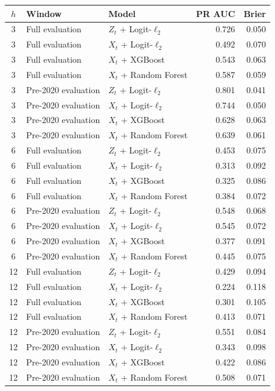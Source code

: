 \begin{tabular}{c l l r r}
\toprule
$h$ & Window & Model & PR AUC & Brier \\
\midrule
3 & Full evaluation & $Z_t$ + Logit-$\ell_2$ & 0.726 & 0.050 \\
3 & Full evaluation & $X_t$ + Logit-$\ell_2$ & 0.492 & 0.070 \\
3 & Full evaluation & $X_t$ + XGBoost & 0.543 & 0.063 \\
3 & Full evaluation & $X_t$ + Random Forest & 0.587 & 0.059 \\
\midrule
3 & Pre-2020 evaluation & $Z_t$ + Logit-$\ell_2$ & 0.801 & 0.041 \\
3 & Pre-2020 evaluation & $X_t$ + Logit-$\ell_2$ & 0.744 & 0.050 \\
3 & Pre-2020 evaluation & $X_t$ + XGBoost & 0.628 & 0.063 \\
3 & Pre-2020 evaluation & $X_t$ + Random Forest & 0.639 & 0.061 \\
\midrule
6 & Full evaluation & $Z_t$ + Logit-$\ell_2$ & 0.453 & 0.075 \\
6 & Full evaluation & $X_t$ + Logit-$\ell_2$ & 0.313 & 0.092 \\
6 & Full evaluation & $X_t$ + XGBoost & 0.325 & 0.086 \\
6 & Full evaluation & $X_t$ + Random Forest & 0.384 & 0.072 \\
\midrule
6 & Pre-2020 evaluation & $Z_t$ + Logit-$\ell_2$ & 0.548 & 0.068 \\
6 & Pre-2020 evaluation & $X_t$ + Logit-$\ell_2$ & 0.545 & 0.072 \\
6 & Pre-2020 evaluation & $X_t$ + XGBoost & 0.377 & 0.091 \\
6 & Pre-2020 evaluation & $X_t$ + Random Forest & 0.445 & 0.075 \\
\midrule
12 & Full evaluation & $Z_t$ + Logit-$\ell_2$ & 0.429 & 0.094 \\
12 & Full evaluation & $X_t$ + Logit-$\ell_2$ & 0.224 & 0.118 \\
12 & Full evaluation & $X_t$ + XGBoost & 0.301 & 0.105 \\
12 & Full evaluation & $X_t$ + Random Forest & 0.413 & 0.071 \\
\midrule
12 & Pre-2020 evaluation & $Z_t$ + Logit-$\ell_2$ & 0.551 & 0.084 \\
12 & Pre-2020 evaluation & $X_t$ + Logit-$\ell_2$ & 0.343 & 0.098 \\
12 & Pre-2020 evaluation & $X_t$ + XGBoost & 0.422 & 0.086 \\
12 & Pre-2020 evaluation & $X_t$ + Random Forest & 0.508 & 0.071 \\
\bottomrule
\end{tabular}
